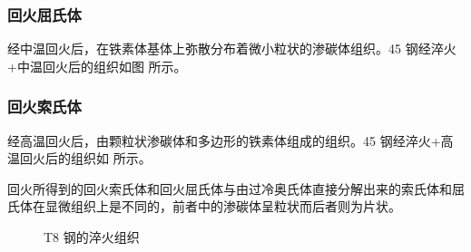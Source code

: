             \subsubsection{回火屈氏体}
                经中温回火后，在铁素体基体上弥散分布着微小粒状的渗碳体组织。45 钢经淬火+中温回火后的组织如图 所示。
            \subsubsection{回火索氏体}
                经高温回火后，由颗粒状渗碳体和多边形的铁素体组成的组织。45 钢经淬火+高温回火后的组织如 所示。\par
                回火所得到的回火索氏体和回火屈氏体与由过冷奥氏体直接分解出来的索氏体和屈氏体在显微组织上是不同的，前者中的渗碳体呈粒状而后者则为片状。
                \begin{figure}[!ht]
                    \centering
                    \hspace{20pt}
                    \hspace{20pt}
                    \caption{T8 钢的淬火组织\label{fig:A4.3}}
                \end{figure}
